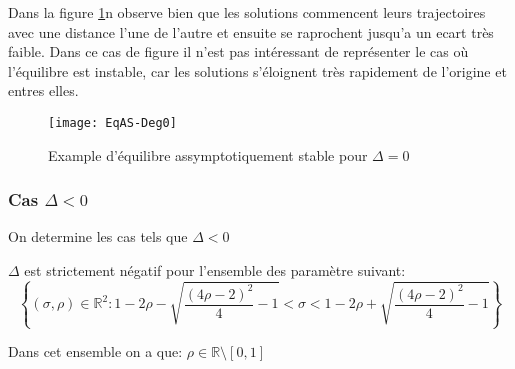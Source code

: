 \documentclass{article}
\newcommand{\R}{\mathbb{R}}
\newtheorem[M , nocut]{prop}{Proposition}[section]
\newtheorem[M]{propt}{Propriété}[section]
\newtheorem[L , nocut]{thm}{Théoreme}
\newtheorem[L]{cor}{Corollaire}
\begin{document}
\begin{example}
    Dans la figure \ref{fig:EqAS-Deg0}n observe bien que les solutions commencent leurs trajectoires avec une distance l'une de l'autre et ensuite se raprochent jusqu'a un ecart très faible. Dans ce cas de figure il n'est pas intéressant de représenter le cas où l'équilibre est instable, car les solutions s'éloignent très rapidement de l'origine et entres elles.
    \begin{figure}[ht]
        \label{fig:EqAS-Deg0}
        \centering
        \texttt{[image: EqAS-Deg0]}
        \caption{Example d'équilibre assymptotiquement stable pour $\Delta=0$}
    \end{figure}
\end{example}

\subsubsection*{Cas $\Delta < 0$}
On determine les cas tels que $\Delta<0$
\begin{prop}
    $\Delta$ est strictement négatif pour l'ensemble des paramètre suivant:
    \[
     \left\{(\sigma,\rho)\in \R ^2 : 1-2 \rho - \sqrt{ \frac{(4\rho-2)^2}{4} -1 }< \sigma < 1-2 \rho + \sqrt{ \frac{(4\rho-2)^2}{4} -1 } \right\}    
    \]
\end{prop}
\begin{example}[Remarque]
    Dans cet ensemble on a que: $\rho \in \R \setminus [0,1]$ 
\end{example}
\end{document}
